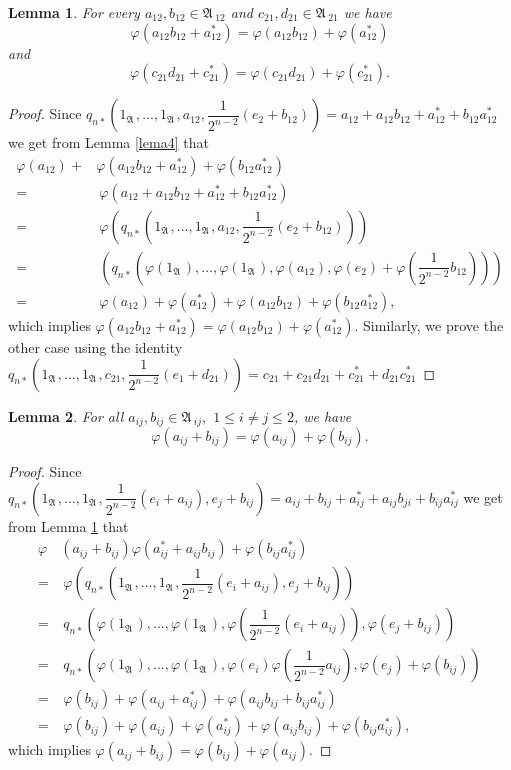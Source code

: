 \documentclass{amsart}
\newtheorem{lemma}{Lemma}[section]
\def\A{{\mathfrak A}\, }
\begin{document}
\begin{lemma}\label{lema5.1}
For every $a_{12}, b_{12} \in \A_{12}$ and $c_{21}, d_{21} \in \A_{21}$ we have  
$$\varphi(a_{12}b_{12}+a^{*}_{
12}) = \varphi(a_{12}b_{12})+\varphi(a^{*}_{12})$$
and
$$\varphi(c_{21}d_{21}+c^{*}_{
21}) = \varphi(c_{21}d_{21})+\varphi(c^{*}_{
21}).$$
\end{lemma}
\begin{proof}
Since 
$q_{n*}\left(1_{\A},...,1_{\A},a_{12}, \dfrac{1}{2^{n-2}}(e_2+b_{12})\right) = a_{12}+a_{12}b_{12} + a_{12}^*+b_{12}a_{12}^*$
we get from Lemma \ref{lema4} that
\begin{align*}
\varphi(a_{12})+ & \varphi(a_{12}b_{12} + a^{*}_{12}) + \varphi(b_{12}a^{*}_{12})\\ 
=& \ \varphi(a_{12} + a_{12}b_{12} + a^{*}_{12} + b_{12}a^{*}_{12}) \\
=& \ \varphi\left( q_{n*}\left(1_{\A},...,1_{\A},a_{12}, \dfrac{1}{2^{n-2}}(e_2+b_{12})\right) \right) \\
=& \ \left( q_{n*}\left(\varphi(1_{\A}),...,\varphi(1_{\A}), \varphi(a_{12}), \varphi(e_2) + \varphi\left(\dfrac{1}{2^{n-2}}b_{12}\right) \right)\right) \\
=& \ \varphi(a_{12}) + \varphi(a_{12}^*) + \varphi(a_{12}b_{12}) + \varphi(b_{12}a_{12}^*),
\end{align*}
which implies $\varphi(a_{12}b_{12} + a^{*}_{12}) = \varphi(a_{12}b_{12}) + \varphi(a^{*}_{12}).$
Similarly, we prove the other case using the identity
$q_{n*}\left(1_{\A},...,1_{\A},c_{21}, \dfrac{1}{2^{n-2}}(e_1+d_{21})\right) = c_{21}+c_{21}d_{21} + c_{21}^*+d_{21}c_{21}^*$
\end{proof}

\begin{lemma}\label{lema5.2}
For all $a_{ij}, b_{ij} \in \A_{ij},$ $1 \leq i \neq j \leq 2$, we have
$$\varphi(a_{ij} + b_{ij}) = \varphi(a_{ij}) + \varphi(b_{ij}).$$
\end{lemma}
\begin{proof}
Since
$q_{n*}\left(1_{\A},...,1_{\A},\dfrac{1}{2^{n-2}}(e_i+a_{ij}), e_j+b_{ij}\right) = a_{ij} + b_{ij} + a_{ij}^* + a_{ij}b_{ji}+b_{ij}a_{ij}^*$
we get from Lemma \ref{lema5.1} that
\begin{align*}
\varphi & (a_{ij}+b_{ij}) \varphi(a_{ij}^* + a_{ij}b_{ij}) + \varphi(b_{ij}a_{ij}^*) \\
=& \ \varphi \left( q_{n*}(1_{\A},...,1_{\A},\dfrac{1}{2^{n-2}}(e_i+a_{ij}),e_j+b_{ij}) \right)\\
=& \  q_{n*}\left(\varphi(1_{\A}),...,\varphi(1_{\A}),\varphi\left(\dfrac{1}{2^{n-2}}(e_i+a_{ij})\right), \varphi(e_j+b_{ij}) \right)\\
=& \  q_{n*}\left(\varphi(1_{\A}),...,\varphi(1_{\A}),\varphi(e_i)\varphi\left(\dfrac{1}{2^{n-2}}a_{ij}\right), \varphi(e_j)+\varphi(b_{ij}) \right)\\
=& \ \varphi(b_{ij}) + \varphi(a_{ij} + a_{ij}^*) +  \varphi(a_{ij}b_{ij}+b_{ij}a_{ij}^*)\\ 
=& \ \varphi(b_{ij}) + \varphi(a_{ij}) + \varphi(a_{ij}^*) + \varphi(a_{ij}b_{ij}) + \varphi(b_{ij}a_{ij}^*), 
\end{align*}
which implies $\varphi(a_{ij} + b_{ij}) = \varphi(b_{ij}) + \varphi(a_{ij})$.
\end{proof}
\end{document}
